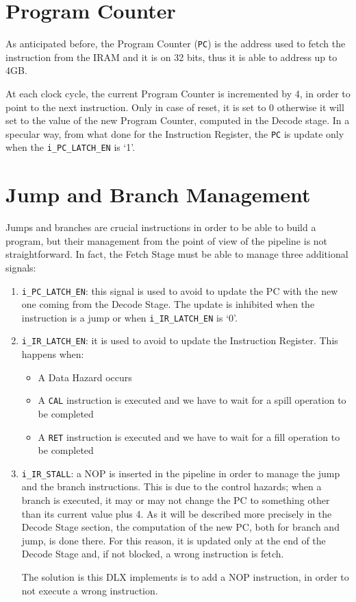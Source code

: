 \section{Program Counter}
As anticipated before, the Program Counter (\texttt{PC}) is the address used to fetch the instruction from the IRAM and it is on 32 bits, thus it is able to address up to 4GB.

At each clock cycle, the current Program Counter is incremented by 4, in order to point to the next instruction. Only in case of reset, it is set to 0 otherwise it will set to the value of the new Program Counter, computed in the Decode stage. In a specular way, from what done for the Instruction Register, the \texttt{PC} is update only when the \texttt{i\_PC\_LATCH\_EN} is `1'.

\section{Jump and Branch Management}
\label{sec:jmp_branch}
Jumps and branches are crucial instructions in order to be able to build a program, but their management from the point of view of the pipeline is not straightforward. In fact, the Fetch Stage must be able to manage three additional signals:
\begin{enumerate}
	\item \texttt{i\_PC\_LATCH\_EN}: this signal is used to avoid to update the PC with the new one coming from the Decode Stage. The update is inhibited when the instruction is a jump or when \texttt{i\_IR\_LATCH\_EN} is `0'. 
	\item \texttt{i\_IR\_LATCH\_EN}: it is used to avoid to update the Instruction Register. This happens when:
	\begin{itemize}
		\item A Data Hazard occurs
		\item A \texttt{CAL} instruction is executed and we have to wait for a spill operation to be completed
		\item A \texttt{RET} instruction is executed and we have to wait for a fill operation to be completed
	\end{itemize}
	\item \texttt{i\_IR\_STALL}: a NOP is inserted in the pipeline in order to manage the jump and the branch instructions. This is due to the control hazards; when a branch is executed, it may or may not change the PC to something other than its current value plus 4. As it will be described more precisely in the Decode Stage section, the computation of the new PC, both for branch and jump, is done there. For this reason, it is updated only at the end of the Decode Stage and, if not blocked, a wrong instruction is fetch.
	
	The solution is this DLX implements is to add a NOP instruction, in order to not execute a wrong instruction.
\end{enumerate}